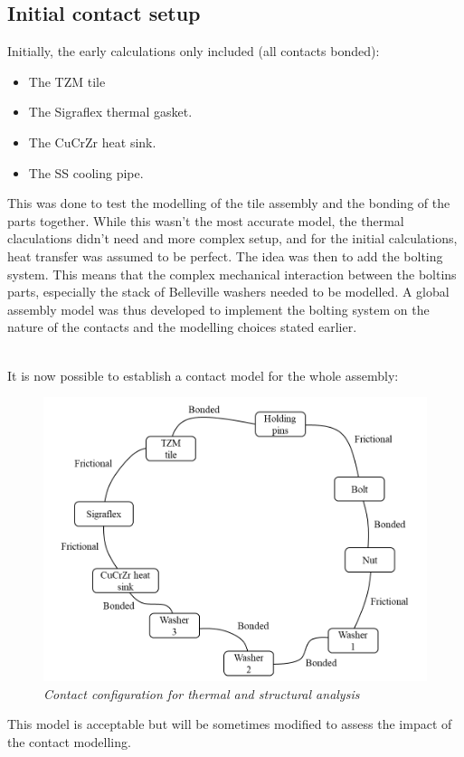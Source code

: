 \subsection{Initial contact setup}
\normalsize{Initially, the early calculations only included (all contacts bonded):
\begin{itemize}
    \item The \acrshort{TZM} tile
    \item The \acrshort{Sigraflex} thermal gasket.
    \item The \acrshort{CuCrZr} heat sink.
    \item The \acrshort{SS} cooling pipe.
  \end{itemize}
This was done to test the modelling of the tile assembly and the bonding of the parts together. While this wasn't the most accurate model, the thermal claculations didn't need and more complex setup, and for the initial calculations, heat transfer was assumed to be perfect. The idea was then to add the bolting system. This means that the complex mechanical interaction between the boltins parts, especially the stack of Belleville washers needed to be modelled. A global assembly model was thus developed to implement the bolting system on the nature of the contacts and the modelling choices stated earlier.}
\\
\break
\normalsize{\indent It is now possible to establish a contact model for the whole assembly:}
\begin{figure}[h!]
  \label{fig_4_1_0} 
  \centering
  \includegraphics[width=.9\textwidth]{figures/contacts.png}
  \caption{\it Contact configuration for thermal and structural analysis}
\end{figure}
\normalsize{This model is acceptable but will be sometimes modified to assess the impact of the contact modelling.}
